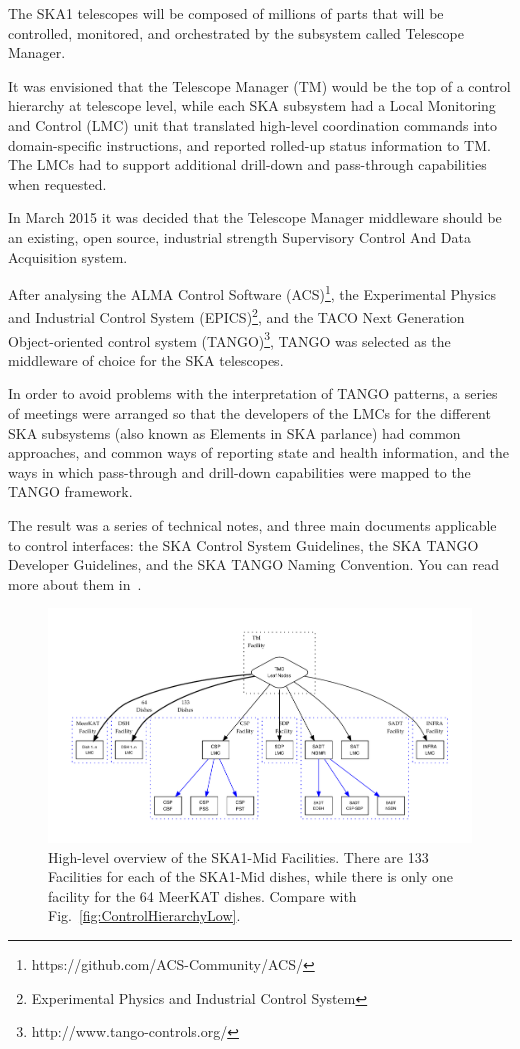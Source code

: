 \documentclass[a4paper,
               biblatex,       %
               keeplastbox,    %
               ]{jacow-2_1}    %
\begin{document}
The SKA1 telescopes will be composed of millions of parts that will be controlled, monitored, and orchestrated by the subsystem called Telescope Manager. 

It was envisioned that the Telescope Manager (TM) would be the top of a control hierarchy at telescope level, while each SKA subsystem had a Local Monitoring and Control (LMC) unit that translated high-level coordination commands into domain-specific instructions, and reported rolled-up status information to TM. The LMCs had to support additional drill-down and pass-through capabilities when requested.

In March 2015 it was decided that the Telescope Manager middleware should be an existing, open source, industrial strength Supervisory Control And Data Acquisition system.

After analysing the ALMA Control Software (ACS)\footnote{https://github.com/ACS-Community/ACS/}, the Experimental Physics and Industrial Control System (EPICS)\footnote{Experimental Physics and 
Industrial Control System}, and the TACO Next Generation Object-oriented control system (TANGO)\footnote{http://www.tango-controls.org/}, TANGO was selected as the middleware of choice for the SKA telescopes.

In order to avoid problems with the interpretation of TANGO patterns, a series of meetings were arranged so that the developers of the LMCs for the different SKA subsystems (also known as Elements in SKA parlance) had common approaches, and common ways of reporting state and health information, and the ways in which pass-through and drill-down capabilities were mapped to the TANGO framework.

The result was a series of technical notes, and three main documents applicable to control interfaces: the SKA Control System Guidelines, the SKA TANGO Developer Guidelines, and the SKA TANGO Naming Convention. You can read more about them in~\cite{ICALEPCS17-MOBPL03}.

\begin{figure}[!tb]
  \centering
    \includegraphics[width=.95\textwidth]{FRAPL01f8}
  \caption{High-level overview of the SKA1-Mid Facilities. There are 133 Facilities for each of the SKA1-Mid dishes, while there is only one facility for the 64 MeerKAT dishes. Compare with Fig.~\ref{fig:ControlHierarchyLow}.}
  \label{fig:ControlHierarchyMid}
\end{figure}
\end{document}
